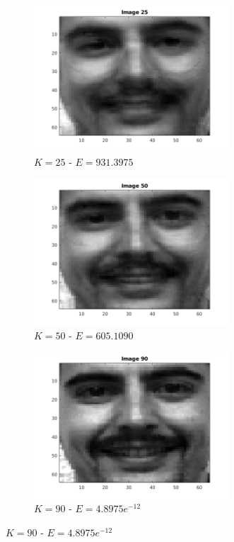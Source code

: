 \documentclass[a4paper]{article}
\begin{document}
\begin{figure}[H]
    \begin{subfigure}[c]{0.3\textwidth}
        \centering
        \includegraphics[width=0.8\textwidth]{images/ex3_50_25.png}
        \caption{$K=25$ - $E = 931.3975$}
        \label{subfig:ex3_50_25}
    \end{subfigure}
    \begin{subfigure}[c]{0.3\textwidth}
        \centering
        \includegraphics[width=0.8\textwidth]{images/ex3_50_50.png}
        \caption{$K=50$ - $E = 605.1090$}
        \label{subfig:ex3_50_50}
    \end{subfigure}
    \begin{subfigure}[c]{0.3\textwidth}
        \centering
        \includegraphics[width=0.8\textwidth]{images/ex3_50_90.png}
        \caption{$K=90$ - $E = 4.8975e^{-12}$}
        \label{subfig:ex3_50_90}
    \end{subfigure}


\end{figure}
\end{document}
